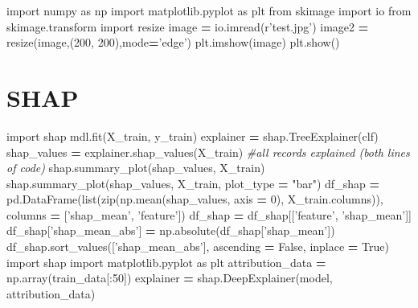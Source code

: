 \documentclass[]{book}
\newenvironment{Shaded}{\begin{snugshade}}{\end{snugshade}}
\newcommand{\BuiltInTok}[1]{#1}
\newcommand{\CommentTok}[1]{\textcolor[rgb]{0.56,0.35,0.01}{\textit{#1}}}
\newcommand{\DecValTok}[1]{\textcolor[rgb]{0.00,0.00,0.81}{#1}}
\newcommand{\ImportTok}[1]{#1}
\newcommand{\NormalTok}[1]{#1}
\newcommand{\OperatorTok}[1]{\textcolor[rgb]{0.81,0.36,0.00}{\textbf{#1}}}
\newcommand{\StringTok}[1]{\textcolor[rgb]{0.31,0.60,0.02}{#1}}
\newcommand{\VariableTok}[1]{\textcolor[rgb]{0.00,0.00,0.00}{#1}}
\newcommand{\VerbatimStringTok}[1]{\textcolor[rgb]{0.31,0.60,0.02}{#1}}
\begin{document}
\begin{Shaded}
\begin{Highlighting}[]
\ImportTok{import}\NormalTok{ numpy }\ImportTok{as}\NormalTok{ np}
\ImportTok{import}\NormalTok{ matplotlib.pyplot }\ImportTok{as}\NormalTok{ plt}
\ImportTok{from}\NormalTok{ skimage }\ImportTok{import}\NormalTok{ io}
\ImportTok{from}\NormalTok{ skimage.transform }\ImportTok{import}\NormalTok{ resize}
\NormalTok{image }\OperatorTok{=}\NormalTok{ io.imread(}\VerbatimStringTok{r'test.jpg'}\NormalTok{)}
\NormalTok{image2 }\OperatorTok{=}\NormalTok{ resize(image,(}\DecValTok{200}\NormalTok{, }\DecValTok{200}\NormalTok{),mode}\OperatorTok{=}\StringTok{'edge'}\NormalTok{)}
\NormalTok{plt.imshow(image)}
\NormalTok{plt.show()}
\end{Highlighting}
\end{Shaded}

\hypertarget{shap}{%
\section{SHAP}\label{shap}}

\begin{Shaded}
\begin{Highlighting}[]
\ImportTok{import}\NormalTok{ shap}
\NormalTok{mdl.fit(X_train, y_train)}
\NormalTok{explainer }\OperatorTok{=}\NormalTok{ shap.TreeExplainer(clf)}
\NormalTok{shap_values }\OperatorTok{=}\NormalTok{ explainer.shap_values(X_train)}
\CommentTok{#all records explained (both lines of code)}
\NormalTok{shap.summary_plot(shap_values, X_train)}
\NormalTok{shap.summary_plot(shap_values, X_train, plot_type }\OperatorTok{=} \StringTok{"bar"}\NormalTok{)}
\NormalTok{df_shap }\OperatorTok{=}\NormalTok{ pd.DataFrame(}\BuiltInTok{list}\NormalTok{(}\BuiltInTok{zip}\NormalTok{(np.mean(shap_values, axis }\OperatorTok{=} \DecValTok{0}\NormalTok{), X_train.columns)),}
\NormalTok{                       columns }\OperatorTok{=}\NormalTok{ [}\StringTok{'shap_mean'}\NormalTok{, }\StringTok{'feature'}\NormalTok{])}
\NormalTok{df_shap }\OperatorTok{=}\NormalTok{ df_shap[[}\StringTok{'feature'}\NormalTok{, }\StringTok{'shap_mean'}\NormalTok{]]}
\NormalTok{df_shap[}\StringTok{'shap_mean_abs'}\NormalTok{] }\OperatorTok{=}\NormalTok{ np.absolute(df_shap[}\StringTok{'shap_mean'}\NormalTok{])}
\NormalTok{df_shap.sort_values([}\StringTok{'shap_mean_abs'}\NormalTok{], ascending }\OperatorTok{=} \VariableTok{False}\NormalTok{, inplace }\OperatorTok{=} \VariableTok{True}\NormalTok{)}
\ImportTok{import}\NormalTok{ shap}
\ImportTok{import}\NormalTok{ matplotlib.pyplot }\ImportTok{as}\NormalTok{ plt}
\NormalTok{attribution_data }\OperatorTok{=}\NormalTok{ np.array(train_data[:}\DecValTok{50}\NormalTok{])}
\NormalTok{explainer }\OperatorTok{=}\NormalTok{ shap.DeepExplainer(model, attribution_data)}
\end{Highlighting}
\end{Shaded}
\end{document}
